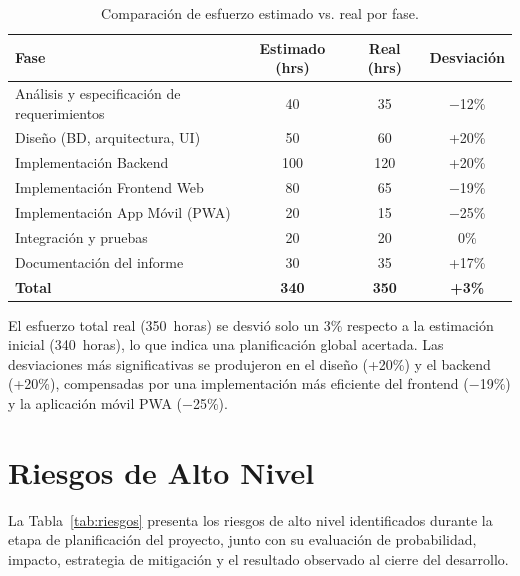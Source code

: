 \begin{table}[H]
\centering
\begin{tabular}{|p{}|c|c|c|}
\hline
\textbf{Fase} & \textbf{Estimado (hrs)} & \textbf{Real (hrs)} & \textbf{Desviación} \\ \hline
Análisis y especificación de requerimientos & 40 & 35 & $-$12\% \\ \hline
Diseño (BD, arquitectura, UI) & 50 & 60 & +20\% \\ \hline
Implementación Backend & 100 & 120 & +20\% \\ \hline
Implementación Frontend Web & 80 & 65 & $-$19\% \\ \hline
Implementación App Móvil (PWA) & 20 & 15 & $-$25\% \\ \hline
Integración y pruebas & 20 & 20 & 0\% \\ \hline
Documentación del informe & 30 & 35 & +17\% \\ \hline
\textbf{Total} & \textbf{340} & \textbf{350} & \textbf{+3\%} \\ \hline
\end{tabular}
\caption{Comparación de esfuerzo estimado vs. real por fase.}
\label{tab:esfuerzo}
\end{table}

El esfuerzo total real (350~horas) se desvió solo un 3\% respecto a la estimación inicial (340~horas), lo que indica una planificación global acertada. Las desviaciones más significativas se produjeron en el diseño (+20\%) y el backend (+20\%), compensadas por una implementación más eficiente del frontend ($-$19\%) y la aplicación móvil PWA ($-$25\%).

\section{Riesgos de Alto Nivel}

La Tabla~\ref{tab:riesgos} presenta los riesgos de alto nivel identificados durante la etapa de planificación del proyecto, junto con su evaluación de probabilidad, impacto, estrategia de mitigación y el resultado observado al cierre del desarrollo.

